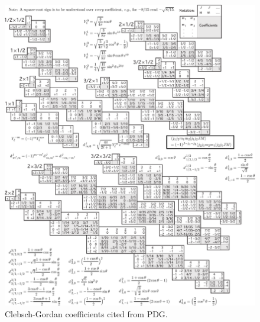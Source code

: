 \documentclass[12pt,twoside]{report}
\numberwithin{problemname}{chapter}
\begin{document}
\begin{figure}
\centering
\includegraphics[width=1.1\textwidth]{CG_Coefficient.pdf}
\caption{\label{fig:CGCoefficient} Clebsch-Gordan coefficients cited from PDG.}
\end{figure}
\end{document}
